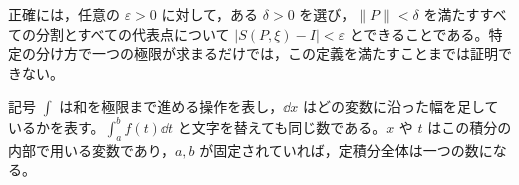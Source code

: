 正確には，任意の $\varepsilon>0$ に対して，ある $\delta>0$ を選び，$\|P\|<\delta$ を満たすすべての分割とすべての代表点について $|S(P,\xi)-I|<\varepsilon$ とできることである。特定の分け方で一つの極限が求まるだけでは，この定義を満たすことまでは証明できない。

記号 $\int$ は和を極限まで進める操作を表し，$\dd x$ はどの変数に沿った幅を足しているかを表す。$
\int_a^b f(t)\dd t$ と文字を替えても同じ数である。$x$ や $t$ はこの積分の内部で用いる変数であり，$a,b$ が固定されていれば，定積分全体は一つの数になる。

